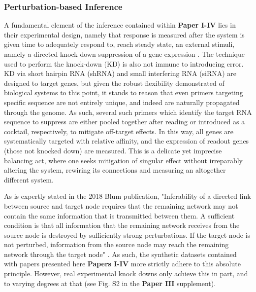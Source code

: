 \subsubsection{Perturbation-based Inference}
\label{sec:ODE}
A fundamental element of the inference contained within \textbf{Paper I-IV} lies in their experimental design, namely that response is measured after the system is given time to adequately respond to, \ie reach steady state, an external stimuli, namely a directed knock-down suppression of a gene expression \citep{pinna2010knockouts,oates2012network,yip2010improved}. The technique used to perform the knock-down (KD) is also not immune to introducing error. KD via short hairpin RNA (shRNA) and small interfering RNA (siRNA) are designed to target genes, but given the robust flexibility demonstrated of biological systems to this point, it stands to reason that even primers targeting specific sequence are not entirely unique, and indeed are naturally propagated through the genome. As such, several such primers which identify the target RNA sequence to suppress are either pooled together after reading or introduced as a cocktail, respectively, to mitigate off-target effects. In this way, all genes are systematically targeted with relative affinity, and the expression of readout genes (those not knocked down) are measured. This is a delicate yet imprecise balancing act, where one seeks mitigation of singular effect without irreparably altering the system, rewiring its connections and measuring an altogether different system. 

As is expertly stated in the 2018 Blum \etal publication, "Inferability of a directed link between source and target node requires that the remaining network may not contain the same information that is transmitted between them. A sufficient condition is that all information that the remaining network receives from the source node is destroyed by sufficiently strong perturbations. If the target node is not perturbed, information from the source node may reach the remaining network through the target node" \citep{blum2018experimental}. As such, the synthetic datasets contained with papers presented here \textbf{Papers I-IV} more strictly adhere to this absolute principle. However, real experimental knock downs only achieve this in part, and to varying degrees at that (see Fig. S2 in the \textbf{Paper III} supplement).

